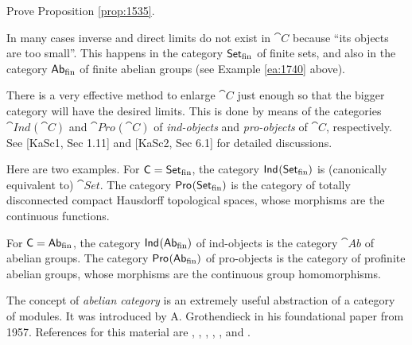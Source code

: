 \begin{exer}  \label{exer:1535}
Prove Proposition \ref{prop:1535}.
\end{exer}

\begin{rem} \label{rem:4090}
In many cases inverse and direct limits do not exist in $\cat{C}$ because ``its 
objects are too small''. This happens in the category 
$\operatorname{\mathsf{Set}}_{\mathrm{fin}}$ of finite sets, and also in the category 
$\mathrm{\mathsf{Ab}}_{\mathrm{fin}}$ of finite abelian groups (see Example \ref{ea:1740} 
above).  

There is a very effective method to enlarge $\cat{C}$ just enough so that the 
bigger category will have the desired limits. This is done by means of the 
categories $\cat{Ind}_{}(\cat{C})$ and $\cat{Pro}_{}(\cat{C})$ of {\em 
ind-objects} and {\em pro-objects} of $\cat{C}$, respectively. 
See [KaSc1, Sec 1.11] and [KaSc2, Sec 6.1] for detailed discussions.

Here are two examples. For $\operatorname{\mathsf{C}} = \operatorname{\mathsf{Set}}_{\mathrm{fin}}$, the 
category $\operatorname{\mathsf{Ind}}_{}(\operatorname{\mathsf{Set}}_{\mathrm{fin}})$ is (canonically equivalent to) 
$\cat{Set}$. 
The category $\operatorname{\mathsf{Pro}}_{}(\operatorname{\mathsf{Set}}_{\mathrm{fin}})$ is the category of 
totally disconnected compact Hausdorff topological spaces, 
whose morphisms are the continuous functions. 

For $\operatorname{\mathsf{C}} = \mathrm{\mathsf{Ab}}_{\mathrm{fin}}$, 
the category $\operatorname{\mathsf{Ind}}_{}(\operatorname{\mathsf{Ab}}_{\mathrm{fin}})$ of ind-objects is the 
category $\cat{Ab}$ of abelian groups. The category 
$\operatorname{\mathsf{Pro}}_{}(\operatorname{\mathsf{Ab}}_{\mathrm{fin}})$ of pro-objects is the category of profinite
abelian groups, whose morphisms are the continuous group homomorphisms. 
\end{rem}






\cleardoublepage
{} \label{sec:abelian}

\AYcopyright

The concept of {\em abelian category} is an extremely useful abstraction of a
category of modules. It was introduced by A. Grothendieck in his foundational 
paper \cite{Gro} from 1957. 
References for this material are \cite{Mac1}, \cite{Mac2}, 
\cite{Rot}, \cite{HiSt}, \cite{We}, \cite{KaSc1} and \cite{KaSc2}.


 \label{subsec:1}

